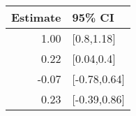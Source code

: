 \begin{tabular}{rl}
  \hline
Estimate & 95\% CI \\ 
  \hline
1.00 & [0.8,1.18] \\ 
  0.22 & [0.04,0.4] \\ 
  -0.07 & [-0.78,0.64] \\ 
  0.23 & [-0.39,0.86] \\ 
   \hline
\end{tabular}

